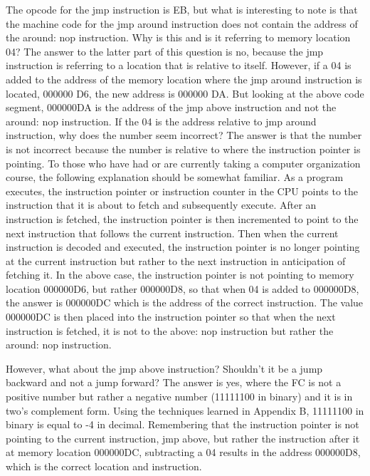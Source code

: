 \documentclass[10pt]{book}
\begin{document}
The opcode for the jmp instruction is EB, but what is interesting to note is that the machine code for the jmp around instruction does not contain the address of the around: nop instruction. Why is this and is it referring to memory location 04? The answer to the latter part of this question is no, because the jmp instruction is referring to a location that is relative to itself. However, if a 04 is added to the address of the memory location where the jmp around instruction is located, 000000 D6, the new address is 000000 DA. But looking at the above code segment, 000000DA is the address of the jmp above instruction and not the around: nop instruction. If the 04 is the address relative to jmp around instruction, why does the number seem incorrect? The answer is that the number is not incorrect because the number is relative to where the instruction pointer is pointing.
To those who have had or are currently taking a computer organization course, the following explanation should be somewhat familiar. As a program executes, the instruction pointer or instruction counter in the CPU points to the instruction that it is about to fetch and subsequently execute. After an instruction is fetched, the instruction pointer is then incremented to point to the next instruction that follows the current instruction. Then when the current instruction is decoded and executed, the instruction pointer is no longer pointing at the current instruction but rather to the next instruction in anticipation of fetching it. In the above case, the instruction pointer is not pointing to memory location 000000D6, but rather 000000D8, so that when 04 is added to 000000D8, the answer is 000000DC which is the address of the correct instruction. The value 000000DC is then placed into the instruction pointer so that when the next instruction is fetched, it is not to the above: nop instruction but rather the around: nop instruction.

However, what about the jmp above instruction? Shouldn't it be a jump backward and not a jump forward? The answer is yes, where the FC is not a positive number but rather a negative number (11111100 in binary) and it is in two's complement form. Using the techniques learned in Appendix B, 11111100 in binary is equal to -4 in decimal. Remembering that the instruction pointer is not pointing to the current instruction, jmp above, but rather the instruction after it at memory location 000000DC, subtracting a 04 results in the address 000000D8, which is the correct location and instruction.
\end{document}
